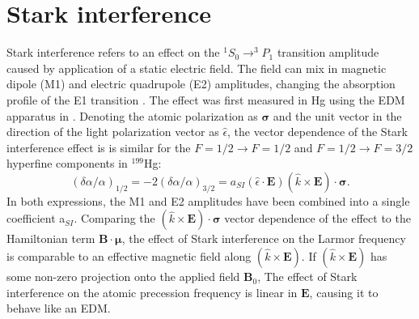 \documentclass [10pt, twoside] {uwthesis}[2012/04/02]
\begin{document}
\section{Stark interference}
Stark interference refers to an effect on the $^1S_0 \rightarrow ^3P_1$ transition amplitude caused by application of a static electric field. The field can mix in magnetic dipole (M1) and electric quadrupole (E2) amplitudes, changing the absorption profile of the E1 transition \cite{Khriplovich_Lamoreaux}. The effect was first measured in Hg using the EDM apparatus in \cite{2011_Hg_Stark_Interference}. Denoting the atomic polarization as $\mathbf{\sigma}$ and the unit vector in the direction of the light polarization vector as $\hat{\epsilon}$, the vector dependence of the Stark interference effect is is similar for the $F=1/2 \rightarrow F=1/2$ and $F=1/2 \rightarrow F=3/2$ hyperfine components in $^{199}$Hg:
\begin{equation}
(\delta\alpha/\alpha)_{1/2} = -2(\delta\alpha/\alpha)_{3/2} = a_{SI}(\hat{\epsilon} \cdot \mathbf{E})(\hat{k} \times \mathbf{E}) \cdot \mathbf{\sigma}.
\end{equation}
In both expressions, the M1 and E2 amplitudes have been combined into a single coefficient a$_{SI}$. Comparing the $(\hat{k} \times \mathbf{E}) \cdot \mathbf{\sigma}$ vector dependence of the effect to the Hamiltonian term $\mathbf{B} \cdot \mathbf{\mu}$, the effect of Stark interference on the Larmor frequency is comparable to an effective magnetic field along $(\hat{k} \times \mathbf{E})$. If $(\hat{k} \times \mathbf{E})$ has some non-zero projection onto the applied field $\mathbf{B}_0$, The effect of Stark interference on the atomic precession frequency is linear in $\mathbf{E}$, causing it to behave like an EDM. 
\end{document}
